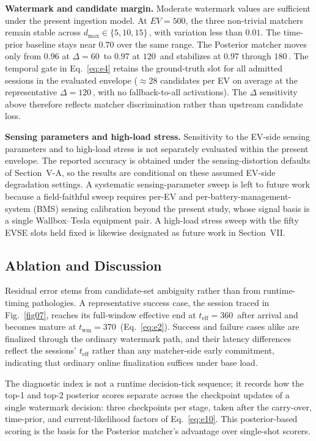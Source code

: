 \documentclass{ieeeaccess}
\begin{document}
    \textbf{Watermark and candidate margin.}
    Moderate watermark values are sufficient under the present ingestion model.
    At $EV = 500$, the three non-trivial matchers remain stable across $d_{\max} \in \{5, 10, 15\}$\,, with variation less than $0.01$.
    The time-prior baseline stays near $0.70$ over the same range.
    The Posterior matcher moves only from $0.96$ at $\Delta = 60$\, to $0.97$ at $120$\, and stabilizes at $0.97$ through $180$\,.
    The temporal gate in Eq.~\eqref{eq:e4} retains the ground-truth slot for all admitted sessions in the evaluated envelope ($\approx$28 candidates per EV on average at the representative $\Delta = 120$\,, with no fallback-to-all activations).
    The $\Delta$ sensitivity above therefore reflects matcher discrimination rather than upstream candidate loss.

    \textbf{Sensing parameters and high-load stress.}
    Sensitivity to the EV-side sensing parameters and to high-load stress is not separately evaluated within the present envelope.
    The reported accuracy is obtained under the sensing-distortion defaults of Section~V-A, so the results are conditional on these assumed EV-side degradation settings. A systematic sensing-parameter sweep is left to future work because a field-faithful sweep requires per-EV and per-battery-management-system (BMS) sensing calibration beyond the present study, whose signal basis is a single Wallbox--Tesla equipment pair. A high-load stress sweep with the fifty EVSE slots held fixed is likewise designated as future work in Section~VII.

    \subsection{Ablation and Discussion}
    Residual error stems from candidate-set ambiguity rather than from runtime-timing pathologies.
    A representative success case, the session traced in Fig.~\ref{fig07}, reaches its full-window effective end at $t_{\text{eff}}=360$\, after arrival and becomes mature at $t_{\text{wm}}=370$\, (Eq.~\eqref{eq:e2}).
    Success and failure cases alike are finalized through the ordinary watermark path, and their latency differences reflect the sessions' $t_{\text{eff}}$ rather than any matcher-side early commitment, indicating that ordinary online finalization suffices under base load.

    The diagnostic index is not a runtime decision-tick sequence; it records how the top-1 and top-2 posterior scores separate across the checkpoint updates of a single watermark decision: three checkpoints per stage, taken after the carry-over, time-prior, and current-likelihood factors of Eq.~\eqref{eq:e10}.
    This posterior-based scoring is the basis for the Posterior matcher's advantage over single-shot scorers.
\end{document}
